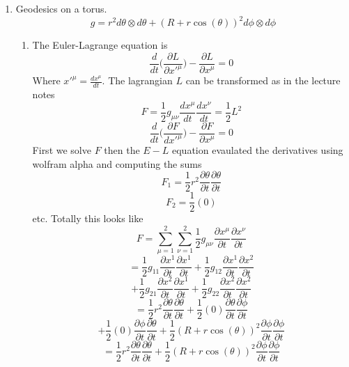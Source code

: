 \documentclass[12pt]{article}
\begin{document}
\begin{enumerate}
\begin{enumerate}
\end{enumerate}
\item Geodesics on a torus. 
$$ g = r^2 d \theta \otimes d \theta + (R+ r \cos(\theta) ) ^2 d \phi \otimes d \phi $$
\begin{enumerate}
  \item The Euler-Lagrange equation is 
$$ \frac{d}{dt} \Big( \frac{\partial L}{\partial x'^{\mu}} \Big) - \frac{\partial L}{\partial x^{\mu}} = 0 $$
Where $x'^{\mu} = \frac{d x^{\mu} }{dt}$. The lagrangian $L$ can be transformed as in the lecture notes 
$$ F = \frac{1}{2} g_{\mu \nu} \frac{d x^{\mu} }{dt} \frac{ d x^{\nu} }{dt} = \frac{1}{2} L^2 $$
$$ \frac{d}{dt} \Big( \frac{\partial F}{d x'^{\mu} } \Big) - \frac{\partial F}{\partial x^{\mu} } = 0 $$
First we solve $F$ then the $E-L$ equation evaulated the derivatives using wolfram alpha and computing the sums 
$$ F_1 = \frac{1}{2} r^2 \frac{\partial \theta}{\partial t} \frac{\partial \theta}{\partial t} $$
$$ F_2 = \frac{1}{2} (0) $$
etc. Totally this looks like 
$$ F = \sum_{\mu =1}^2 \sum_{\nu=1}^2 \frac{1}{2} g_{\mu \nu} \frac{\partial x^{\mu}}{\partial t} \frac{\partial x^{\nu}}{\partial t} $$
$$ = \frac{1}{2} g_{11} \frac{\partial x^1}{\partial t} \frac{\partial x^1}{\partial t} + \frac{1}{2} g_{12} \frac{\partial x^1}{\partial t} \frac{\partial x^2}{\partial t} $$
$$ + \frac{1}{2} g_{21} \frac{\partial x^2}{\partial t} \frac{\partial x^1}{\partial t} + \frac{1}{2} g_{22} \frac{\partial x^2}{\partial t} \frac{\partial x^2}{\partial t} $$
$$ = \frac{1}{2} r^2 \frac{\partial \theta}{\partial t}\frac{\partial \theta}{\partial t} + \frac{1}{2} (0) \frac{\partial \theta}{\partial t} \frac{\partial \phi}{\partial t} $$
$$ + \frac{1}{2} (0) \frac{\partial \phi}{\partial t} \frac{\partial \theta}{\partial t} + \frac{1}{2} ( R+ r \cos(\theta))^2 \frac{\partial \phi}{\partial t} \frac{\partial \phi}{\partial t} $$
$$ = \frac{1}{2} r^2 \frac{\partial \theta}{\partial t} \frac{\partial \theta}{\partial t} + \frac{1}{2} (R + r \cos(\theta))^2 \frac{\partial \phi}{\partial t} \frac{\partial \phi}{\partial t} $$


\end{enumerate}
\end{enumerate}
\end{document}

